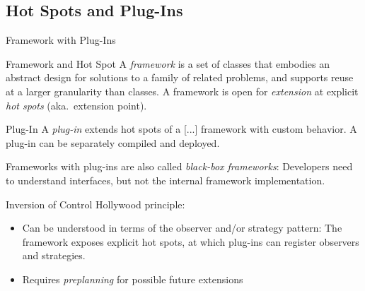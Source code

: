 
\subsection{Hot Spots and Plug-Ins}
\begin{frame}{Framework with Plug-Ins}
	\begin{fancycolumns}[b]
		\begin{definition}{Framework and Hot Spot }
			A \emph{framework} is a set of classes that embodies an abstract design for solutions to a family of related problems, and supports reuse at a larger granularity than classes. A framework is open for \emph{extension} at explicit \emph{hot spots} (aka.\ extension point).
		\end{definition}
		\begin{definition}{Plug-In }
			A \emph{plug-in} extends hot spots of a [...] framework with custom behavior. A plug-in can be separately compiled and deployed.	
		\end{definition}
		\begin{note}{}
			Frameworks with plug-ins are also called \emph{black-box frameworks}: Developers need to understand interfaces, but not the internal framework implementation.
		\end{note}
	\nextcolumn
		\vspace{-12mm}
		\begin{note}{Inversion of Control}
			Hollywood principle: 

			\centering 
		\end{note}
		\begin{note}{}
			\begin{itemize}
				\item Can be understood in terms of the observer and/or strategy pattern: The framework exposes explicit hot spots, at which plug-ins can register observers and strategies.
				\item Requires \emph{preplanning} for possible future extensions
			\end{itemize}
		\end{note}
	\end{fancycolumns}
\end{frame}

